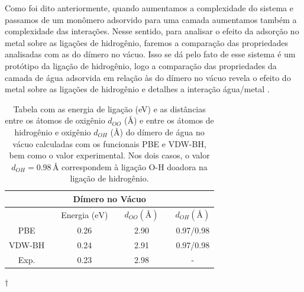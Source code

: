 
Como foi dito anteriormente, quando aumentamos a complexidade do sistema e passamos de um monômero adsorvido para uma camada aumentamos também a complexidade das interações. Nesse sentido, para analisar o efeito da adsorção no metal sobre as ligações de hidrogênio, faremos a comparação das propriedades analisadas com as do dímero no vácuo. Isso se dá pelo fato de esse sistema é um protótipo da ligação de hidrogênio, logo a comparação das propriedades da camada de água adsorvida em relação às do dímero no vácuo revela o efeito do metal sobre as ligações de hidrogênio e detalhes a interação água/metal \cite{monomer}.
\begin{table}[b!]
	\centering
	\caption{Tabela com as energia de ligação (eV) e as distâncias entre os átomos de oxigênio $d_{OO}$ ($\si{\angstrom}$) e entre os átomos de hidrogênio e oxigênio $d_{OH}$ ($\si{\angstrom}$) do dímero de água no vácuo calculadas com os funcionais PBE e VDW-BH, bem como o valor experimental. Nos dois casos, o valor $d_{OH}=0.98\,\si{\angstrom}$ correspondem à ligação O-H doadora na ligação de hidrogênio. \label{tab:dimero}}
	\begin{threeparttable}
		\begin{tabular}{ccccccc} 
			\hline\hline
			\multicolumn{7}{c}{ \textbf{Dímero no Vácuo} }        \\ \midrule
			&  & Energia ($ \si{\eV} $)                                  &  & $ d_{OO}(\si{\angstrom})$                                         &  & $ d_{OH}(\si{\angstrom})$                \\\midrule
			PBE    &  & 0.26                                   &  & 2.90                                         &  & 0.97/0.98                              \\
			VDW-BH &  & 0.24                                   &  & 2.91                                         &  & 0.97/0.98                              \\
			Exp.\tnote{$\dagger$}   &  & 0.23                                   &  & 2.98                                         &  &  -                                      \\
			\hline\hline
		\end{tabular}
		\begin{tablenotes}\footnotesize
			\item[$\dagger$] \citeauthor{dimer-exp}
		\end{tablenotes}
	\end{threeparttable}
\end{table}
